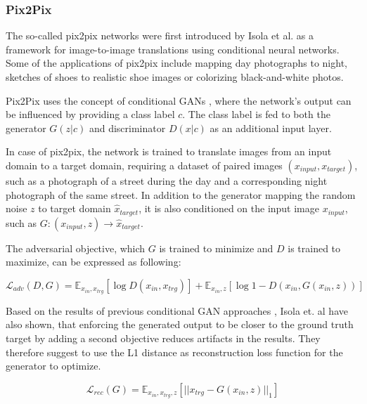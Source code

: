 \documentclass{article}
\begin{document}
\subsubsection{Pix2Pix}
The so-called pix2pix networks were first introduced by Isola et al. \cite{isola_image--image_2016} as a framework for image-to-image translations using conditional neural networks. Some of the applications of pix2pix include mapping day photographs to night, sketches of shoes to realistic shoe images or colorizing black-and-white photos.

Pix2Pix uses the concept of conditional GANs \cite{mirza_conditional_2014}, where the network's output can be influenced by providing a class label $c$. The class label is fed to both the generator $G(z|c)$ and discriminator $D(x|c)$ as an additional input layer.

In case of pix2pix, the network is trained to translate images from an input domain to a target domain, requiring a dataset of paired images $(x_{input}, x_{target})$, such as a photograph of a street during the day and a corresponding night photograph of the same street. In addition to the generator mapping the random noise $z$ to target domain $\hat{x}_{target}$, it is also conditioned on the input image $x_{input}$, such as $G: (x_{input}, z) \rightarrow \hat{x}_{target}$.

The adversarial objective, which $G$ is trained to minimize and $D$ is trained to maximize, can be expressed as following:

\begin{equation}
\mathcal{L}_{adv}(D,G) = \mathbb{E}_{x_{in},x_{trg}}[\log D(x_{in},x_{trg})] + \mathbb{E}_{x_{in},z}[\log 1 - D(x_{in}, G(x_{in},z))]
\label{eq:pix2pix_minimax_cond}
\end{equation}

Based on the results of previous conditional GAN approaches \cite{pathak_context_2016}, Isola et. al \cite{isola_image--image_2016} have also shown, that enforcing the generated output to be closer to the ground truth target by adding a second objective reduces artifacts in the results. They therefore suggest to use the L1 distance as reconstruction loss function for the generator to optimize.

\begin{equation}
\mathcal{L}_{rec}(G) = \mathbb{E}_{x_{in},x_{trg},z}[||x_{trg}-G(x_{in},z)||_{1}]
\label{eq:pix2pix_loss_rec}
\end{equation}
\end{document}
